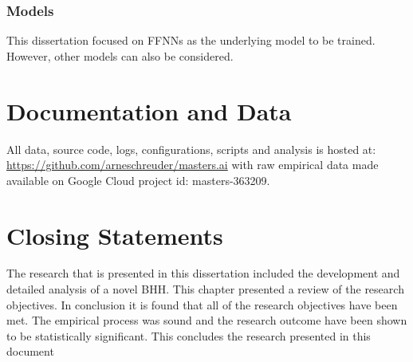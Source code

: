 \subsubsection{Models}

This dissertation focused on \acp{FFNN} as the underlying model to be trained. However, other models can also be considered.


\section{Documentation and Data}
\label{sec:conclusion:documentation_and_data}

All data, source code, logs, configurations, scripts and analysis is hosted at: \url{https://github.com/arneschreuder/masters.ai} with raw empirical data made available on Google Cloud project id: masters-363209.


\section{Closing Statements}
\label{sec:conclusion:closing_statements}

The research that is presented in this dissertation included the development and detailed analysis of a novel \ac{BHH}. This chapter presented a review of the research objectives. In conclusion it is found that all of the research objectives have been met. The empirical process was sound and the research outcome have been shown to be statistically significant. This concludes the research presented in this document

